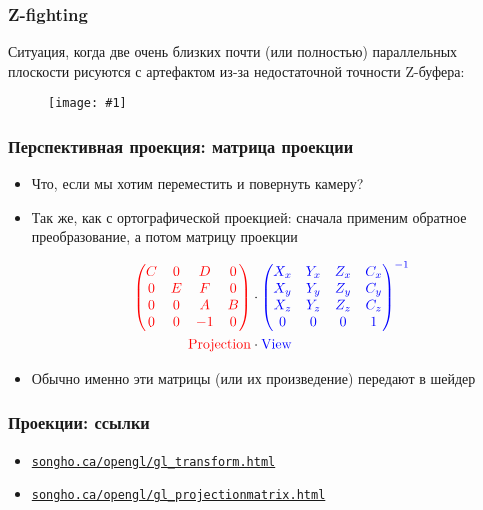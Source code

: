 \documentclass[10pt]{beamer}
\newcommand{\slideimage}[1]{
  \begin{figure}
    \begin{adjustbox}{width=\textwidth, totalheight=\textheight-2\baselineskip-2\baselineskip,keepaspectratio}
      \texttt{[image: \#1]}
    \end{adjustbox}
  \end{figure}
}
\begin{document}
\begin{frame}[fragile]
\frametitle{Z-fighting}
Ситуация, когда две очень близких почти (или полностью) параллельных плоскости рисуются с артефактом из-за недостаточной точности Z-буфера:
\slideimage{z-fighting.png}
\end{frame}

\begin{frame}[fragile]
\frametitle{Перспективная проекция: матрица проекции}
\begin{itemize}
\item Что, если мы хотим переместить и повернуть камеру?
\pause
\item Так же, как с ортографической проекцией: сначала применим обратное преобразование, а потом матрицу проекции
\pause
\begin{center}
\begin{equation}
\begin{split}
{\color{red}
\begin{pmatrix}
C & 0 & D & 0 \\
0 & E & F & 0 \\
0 & 0 & A & B \\
0 & 0 & -1 & 0
\end{pmatrix}
}
& \cdot
{\color{blue}
\begin{pmatrix}
X_x & Y_x & Z_x & C_x \\
X_y & Y_y & Z_y & C_y \\
X_z & Y_z & Z_z & C_z \\
0 & 0 & 0 & 1
\end{pmatrix}^{-1}
}
\\
{\color{red}
\operatorname{Projection}
}
& \cdot
{\color{blue}
\operatorname{View}
}
\end{split}
\end{equation}
\end{center}
\pause
\item Обычно именно эти матрицы (или их произведение) передают в шейдер
\end{itemize}
\end{frame}

\begin{frame}[fragile]
\frametitle{Проекции: ссылки}
\begin{itemize}
\item \href{http://songho.ca/opengl/gl_transform.html}{\nolinkurl{songho.ca/opengl/gl\_transform.html}}
\item \href{http://songho.ca/opengl/gl_projectionmatrix.html}{\nolinkurl{songho.ca/opengl/gl\_projectionmatrix.html}}
\end{itemize}
\end{frame}
\end{document}
